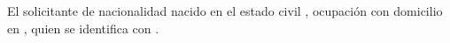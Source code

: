 El solicitante \insertar de nacionalidad \insertar nacido en \insertar el \insertar estado civil \insertar, ocupaci\'on \insertar con domicilio en \insertar, quien se identifica con \insertar.